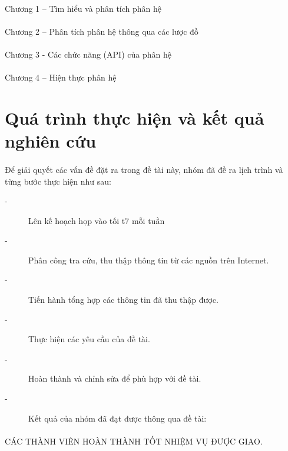 \documentclass{report}
\begin{document}
	\paragraph{}
	Chương 1 – Tìm hiểu và phân tích phân hệ 
	\paragraph{}
        Chương 2 – Phân tích phân hệ thông qua các lược đồ
        \paragraph{}
        Chương 3 - Các chức năng (API) của phân hệ
        \paragraph{}
        Chương 4 – Hiện thực phân hệ
    \section*{Quá trình thực hiện và kết quả nghiên cứu}
    \paragraph{}
    Để giải quyết các vấn đề đặt ra trong đề tài này, nhóm đã đề ra lịch trình và từng bước thực hiện như sau:
    \begin{description}
    \item[-] {Lên kế hoạch họp vào tối t7 mỗi tuần}
    \item[-] {Phân công tra cứu, thu thập thông tin từ các nguồn trên Internet.}
    \item[-] {Tiến hành tổng hợp các thông tin đã thu thập được.}
    \item[-] {Thực hiện các yêu cầu của đề tài.}
    \item[-] {Hoàn thành và chỉnh sửa để phù hợp với đề tài.}
    \item[-] {Kết quả của nhóm đã đạt được thông qua đề tài: }
    \end{description}
    \paragraph{}
    CÁC THÀNH VIÊN HOÀN THÀNH TỐT NHIỆM VỤ ĐƯỢC GIAO.
\pagebreak
\end{document}
